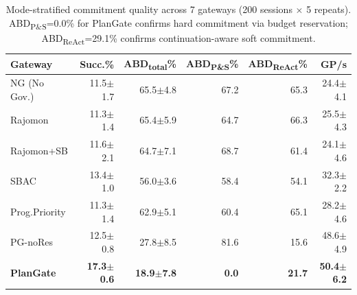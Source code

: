 \begin{table}[t]
\centering
\caption{Mode-stratified commitment quality across 7 gateways (200 sessions $\times$ 5 repeats). ABD\textsubscript{P\&S}=0.0\% for PlanGate confirms hard commitment via budget reservation; ABD\textsubscript{ReAct}=29.1\% confirms continuation-aware soft commitment.}
\label{tab:commitment-quality}
\small
\begin{tabular}{l r r r r r}
\toprule
Gateway & Succ.\% & ABD\textsubscript{total}\% & ABD\textsubscript{P\&S}\% & ABD\textsubscript{ReAct}\% & GP/s \\
\midrule
NG (No Gov.) & 11.5$\pm$1.7 & 65.5$\pm$4.8 & 67.2 & 65.3 & 24.4$\pm$4.1 \\
Rajomon & 11.3$\pm$1.4 & 65.4$\pm$5.9 & 64.7 & 66.3 & 25.5$\pm$4.3 \\
Rajomon+SB & 11.6$\pm$2.1 & 64.7$\pm$7.1 & 68.7 & 61.4 & 24.1$\pm$4.6 \\
SBAC & 13.4$\pm$1.0 & 56.0$\pm$3.6 & 58.4 & 54.1 & 32.3$\pm$2.2 \\
Prog.Priority & 11.3$\pm$1.4 & 62.9$\pm$5.1 & 60.4 & 65.1 & 28.2$\pm$4.6 \\
PG-noRes & 12.5$\pm$0.8 & 27.8$\pm$8.5 & 81.6 & 15.6 & 48.6$\pm$4.9 \\
\textbf{PlanGate} & \textbf{17.3$\pm$0.6} & \textbf{18.9$\pm$7.8} & \textbf{0.0} & \textbf{21.7} & \textbf{50.4$\pm$6.2} \\
\bottomrule
\end{tabular}
\end{table}